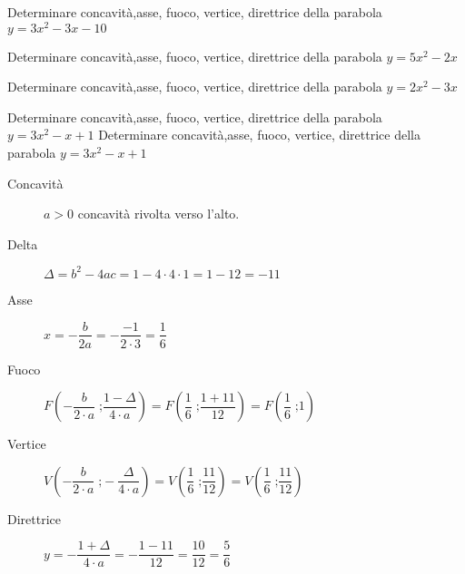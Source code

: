 \begin{exercise}[no solution]
	Determinare concavità,asse, fuoco, vertice, direttrice della parabola $y=3x^2-3x-10$
\end{exercise}
\begin{exercise}[no solution]
	Determinare concavità,asse, fuoco, vertice, direttrice della parabola $y=5x^2-2x$
\end{exercise}
\begin{exercise}[no solution]
	Determinare concavità,asse, fuoco, vertice, direttrice della parabola $y=2x^2-3x$
\end{exercise}
  \begin{exercise}
	Determinare concavità,asse, fuoco, vertice, direttrice della parabola $y=3x^2-x+1$
	\tcblower
	Determinare concavità,asse, fuoco, vertice, direttrice della parabola $y=3x^2-x+1$
		\begin{description}
			\item[Concavità] $a>0$ concavità rivolta verso l'alto.
			\item[Delta] $\Delta=b^2-4ac=1-4\cdot 4\cdot 1=1-12=-11$
			\item[Asse] $x=-\dfrac{b}{2a}=-\dfrac{-1}{2\cdot 3}=\dfrac{1}{6}$
			\item[Fuoco] $F\left(-\dfrac{b}{2\cdot a}\;\text{;}\dfrac{1-\Delta}{4\cdot a}\right)=F\left(\dfrac{1}{6}\;\text{;}\dfrac{1+11}{12}\right)=F\left(\dfrac{1}{6}\;\text{;} 1\right)$
			\item[Vertice] $V\left(-\dfrac{b}{2\cdot a}\;\text{;}-\dfrac{\Delta}{4\cdot a}\right)=V\left(\dfrac{1}{6}\;\text{;}\dfrac{11}{12}\right)=V\left(\dfrac{1}{6}\;\text{;} \dfrac{11}{12}\right)$
			\item[Direttrice] $y=-\dfrac{1+\Delta}{4\cdot a}=-\dfrac{1-11}{12}=\dfrac{10}{12}=\dfrac{5}{6}$
		\end{description}
%		
\end{exercise}
